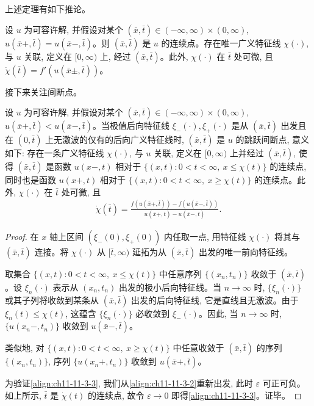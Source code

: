 \documentclass[../../main.tex]{subfiles}
\begin{document}
上述定理有如下推论。

\begin{theorem}\label{theorem:ch11-11-3-2}
设 $u$ 为可容许解, 并假设对某个 $(\bar x,\bar t)\in(-\infty,\infty)\times(0,\infty)$, $u(\bar x+,\bar t)=u(\bar x-,\bar t)$。则 $(\bar x,\bar t)$ 是 $u$ 的连续点。存在唯一广义特征线 $\chi(\cdot)$, 与 $u$ 关联, 定义在 $[0,\infty)$ 上, 经过 $(\bar x,\bar t)$。此外, $\chi(\cdot)$ 在 $\bar t$ 处可微, 且 $\dot{\chi}(\bar t)=f'(u(\bar x\pm,\bar t))$。
\end{theorem}

接下来关注间断点。

\begin{theorem}\label{theorem:ch11-11-3-3}
设 $u$ 为可容许解, 并假设对某个 $(\bar x,\bar t)\in(-\infty,\infty)\times(0,\infty)$, $u(\bar x+,\bar t)<u(\bar x-,\bar t)$。当极值后向特征线 $\xi_-(\cdot),\xi_+(\cdot)$ 是从 $(\bar x,\bar t)$ 出发且在 $(0,\bar t)$ 上无激波的仅有的后向广义特征线时, $(\bar x,\bar t)$ 是 $u$ 的跳跃间断点, 意义如下: 存在一条广义特征线 $\chi(\cdot)$, 与 $u$ 关联, 定义在 $[0,\infty)$ 上并经过 $(\bar x,\bar t)$, 使得 $(\bar x,\bar t)$ 是函数 $u(x-,t)$ 相对于 $\{(x,t):0<t<\infty,\ x\leqslant\chi(t)\}$ 的连续点, 同时也是函数 $u(x+,t)$ 相对于 $\{(x,t):0<t<\infty,\ x\geqslant\chi(t)\}$ 的连续点。此外, $\chi(\cdot)$ 在 $\bar t$ 处可微, 且
\begin{align}
\dot{\chi}(\bar t)=\frac{f(u(\bar x+,\bar t))-f(u(\bar x-,\bar t))}{u(\bar x+,\bar t)-u(\bar x-,\bar t)}.\label{align:ch11-11-3-3}
\end{align}
\end{theorem}

\begin{proof}
在 $x$ 轴上区间 $(\xi_-(0),\xi_+(0))$ 内任取一点, 用特征线 $\chi(\cdot)$ 将其与 $(\bar x,\bar t)$ 连接。将 $\chi(\cdot)$ 从 $[\bar t,\infty)$ 延拓为从 $(\bar x,\bar t)$ 出发的唯一前向特征线。

取集合 $\{(x,t):0<t<\infty,\ x\leqslant\chi(t)\}$ 中任意序列 $\{(x_n,t_n)\}$ 收敛于 $(\bar x,\bar t)$。设 $\xi_n(\cdot)$ 表示从 $(x_n,t_n)$ 出发的极小后向特征线。当 $n\to\infty$ 时, $\{\xi_n(\cdot)\}$ 或其子列将收敛到某条从 $(\bar x,\bar t)$ 出发的后向特征线, 它是直线且无激波。由于 $\xi_n(t)\leqslant\chi(t)$, 这蕴含 $\{\xi_n(\cdot)\}$ 必收敛到 $\xi_-(\cdot)$。因此, 当 $n\to\infty$ 时, $\{u(x_n-,t_n)\}$ 收敛到 $u(\bar x-,\bar t)$。

类似地, 对 $\{(x,t):0<t<\infty,\ x\geqslant\chi(t)\}$ 中任意收敛于 $(\bar x,\bar t)$ 的序列 $\{(x_n,t_n)\}$, 序列 $\{u(x_n+,t_n)\}$ 收敛到 $u(\bar x+,\bar t)$。

为验证\eqref{align:ch11-11-3-3}, 我们从\eqref{align:ch11-11-3-2}重新出发, 此时 $\varepsilon$ 可正可负。如上所示, $\bar t$ 是 $\dot{\chi}(t)$ 的连续点, 故令 $\varepsilon\to0$ 即得\eqref{align:ch11-11-3-3}。证毕。
\end{proof}
\end{document}
